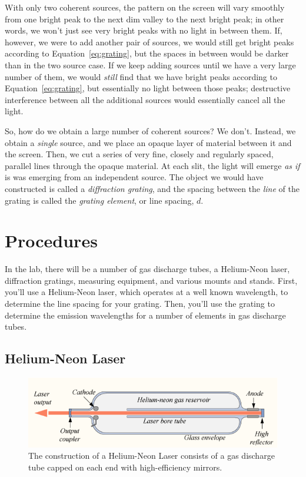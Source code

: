 \documentclass[12pt]{article}
\begin{document}
With only two coherent sources, the pattern on the screen will vary
smoothly from one bright peak to the next dim valley to the next
bright peak; in other words, we won't just see very bright peaks with
no light in between them.  If, however, we were to add another pair of
sources, we would still get bright peaks according to
Equation~\eqref{eq:grating}, but the spaces in between would be darker
than in the two source case.  If we keep adding sources until we have
a very large number of them, we would \textit{still} find that we have
bright peaks according to Equation~\eqref{eq:grating}, but essentially
no light between those peaks; destructive interference between all
the additional sources would essentially cancel all the light.

So, how do we obtain a large number of coherent sources?  We don't.
Instead, we obtain a \textit{single} source, and we place an opaque
layer of material between it and the screen.  Then, we cut a series of
very fine, closely and regularly spaced, parallel lines through the
opaque material.  At each slit, the light will emerge \textit{as if}
is was emerging from an independent source.  The object we would have
constructed is called a \textit{diffraction grating}, and the spacing
between the \textit{line} of the grating is called the \textit{grating
  element}, or line spacing, $d$.

\section{Procedures}
\label{sec:procedures}

In the lab, there will be a number of gas discharge tubes, a
Helium-Neon laser, diffraction gratings, measuring equipment, and
various mounts and stands.  First, you'll use a Helium-Neon laser,
which operates at a well known wavelength, to determine the line
spacing for your grating.  Then, you'll use the grating to determine
the emission wavelengths for a number of elements in gas discharge
tubes. 

\subsection{Helium-Neon Laser}
\label{sec:laser}

\begin{figure}
  \centering
  \includegraphics[width=2\textwidth/3]{figures/Hene-1}
  \caption{The construction of a Helium-Neon Laser consists of a gas
    discharge tube capped on each end with high-efficiency mirrors.}
  \label{fig:lasertube}
\end{figure}
\end{document}
